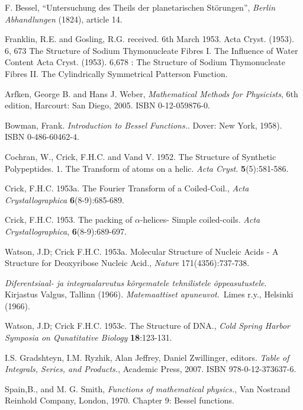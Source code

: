 \documentclass[12pt]{article}
\theoremstyle{plain}
\theoremstyle{definition}
\numberwithin{equation}{section}
\begin{document}
\begin{thebibliography}{99}
F. Bessel, ``Untersuchung des Theils der planetarischen St\"orungen'', {\em Berlin Abhandlungen} (1824), article 14.

Franklin, R.E. and Gosling, R.G. received. 6th March 1953. Acta Cryst. (1953). 6, 673 The Structure of Sodium Thymonucleate Fibres I. The Influence of Water Content Acta Cryst. (1953). 6,678 : The Structure of Sodium Thymonucleate Fibres II. The Cylindrically Symmetrical Patterson Function. 

Arfken, George B. and Hans J. Weber, {\em Mathematical Methods for Physicists}, 6th edition, Harcourt: San Diego, 2005. ISBN 0-12-059876-0.
 
Bowman, Frank. {\em Introduction to Bessel Functions.}. Dover: New York, 1958). ISBN 0-486-60462-4. 

Cochran, W., Crick, F.H.C. and Vand V. 1952. The Structure of Synthetic Polypeptides. 1. The Transform of atoms on a helic. {\em Acta Cryst.} {\bf 5}(5):581-586. 

Crick, F.H.C. 1953a. The Fourier Transform of a Coiled-Coil., {\em Acta Crystallographica} {\bf 6}(8-9):685-689. 

Crick, F.H.C. 1953. The packing of $\alpha$-helices- Simple coiled-coils. 
{\em Acta Crystallographica}, {\bf 6}(8-9):689-697. 

Watson, J.D; Crick F.H.C. 1953a. Molecular Structure of Nucleic Acids - A Structure for Deoxyribose Nucleic Acid., {\em Nature} 171(4356):737-738. 

 {\em Diferentsiaal- ja integraalarvutus k\~{o}rgematele tehnilistele \~{o}ppeasutustele}.\, Kirjastus Valgus, Tallinn  (1966).
 {\em Matemaattiset apuneuvot}.\, Limes r.y., Helsinki (1966).

Watson, J.D; Crick F.H.C. 1953c. The Structure of DNA., {\em Cold Spring Harbor Symposia on Qunatitative Biology} {\bf 18}:123-131. 
 
I.S. Gradshteyn, I.M. Ryzhik, Alan Jeffrey, Daniel Zwillinger, editors. {\em Table of Integrals, Series, and Products.},  Academic Press, 2007. 
ISBN 978-0-12-373637-6.

Spain,B., and M. G. Smith, {\em Functions of mathematical physics.}, Van Nostrand Reinhold Company, London, 1970. Chapter 9: Bessel functions.


\end{thebibliography}
\end{document}
